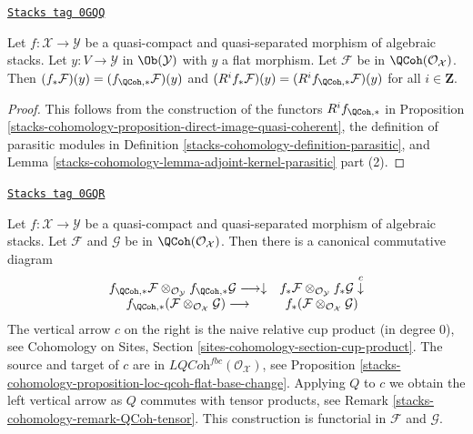 \begin{lemma}
\label{stacks-cohomology-lemma-direct-image-quasi-coherent-over-flat}
\href{https://stacks.math.columbia.edu/tag/0GQQ}{\texttt{Stacks tag 0GQQ}}

Let $f : \mathcal{X} \to \mathcal{Y}$ be a quasi-compact and quasi-separated
morphism of algebraic stacks. Let $y : V \to \mathcal{Y}$ in $\Ob(\mathcal{Y})$
with $y$ a flat morphism. Let $\mathcal{F}$ be in
$\QCoh(\mathcal{O}_\mathcal{X})$.
Then $(f_*\mathcal{F})(y) = (f_{\QCoh, *}\mathcal{F})(y)$
and $(R^if_*\mathcal{F})(y) = (R^if_{\QCoh, *}\mathcal{F})(y)$
for all $i \in \mathbf{Z}$.
\end{lemma}

\begin{proof}
This follows from the construction of the functors $R^if_{\QCoh, *}$ in
Proposition \ref{stacks-cohomology-proposition-direct-image-quasi-coherent},
the definition of parasitic modules in Definition \ref{stacks-cohomology-definition-parasitic},
and Lemma \ref{stacks-cohomology-lemma-adjoint-kernel-parasitic} part (2).
\end{proof}

\begin{remark}
\label{stacks-cohomology-remark-direct-image-quasi-coherent-tensor}
\href{https://stacks.math.columbia.edu/tag/0GQR}{\texttt{Stacks tag 0GQR}}

Let $f : \mathcal{X} \to \mathcal{Y}$ be a quasi-compact and quasi-separated
morphism of algebraic stacks. Let $\mathcal{F}$ and $\mathcal{G}$ be in
$\QCoh(\mathcal{O}_\mathcal{X})$. Then there is a canonical commutative
diagram
$$
\begin{array}{cc}f_{\QCoh, *}\mathcal{F}
\otimes_{\mathcal{O}_\mathcal{Y}}
f_{\QCoh, *}\mathcal{G} \longrightarrow\downarrow & f_*\mathcal{F}
\otimes_{\mathcal{O}_\mathcal{Y}}
f_*\mathcal{G} \overset{c}{\downarrow} \\ f_{\QCoh, *}(\mathcal{F}
\otimes_{\mathcal{O}_\mathcal{X}}
\mathcal{G}) \longrightarrow & f_*(\mathcal{F}
\otimes_{\mathcal{O}_\mathcal{X}}
\mathcal{G})\end{array}
$$
The vertical arrow $c$ on the right is the naive relative cup product
(in degree $0$),
see Cohomology on Sites, Section \ref{sites-cohomology-section-cup-product}.
The source and target of $c$ are in
$\textit{LQCoh}^{fbc}(\mathcal{O}_\mathcal{X})$, see
Proposition \ref{stacks-cohomology-proposition-loc-qcoh-flat-base-change}.
Applying $Q$ to $c$ we obtain the left vertical arrow
as $Q$ commutes with tensor products, see
Remark \ref{stacks-cohomology-remark-QCoh-tensor}.
This construction is functorial in $\mathcal{F}$ and $\mathcal{G}$.
\end{remark}

